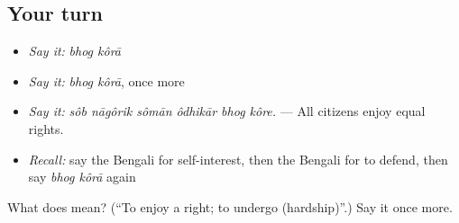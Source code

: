 \subsection*{Your turn}
\begin{itemize}
\raggedright
  \item \emph{Say it:} \emph{bhog kôrā}
  \item \emph{Say it:} \emph{bhog kôrā}, once more
  \item \emph{Say it:} \emph{sôb nāgôrik sômān ôdhikār bhog kôre.} — All citizens enjoy equal rights.
  \item \emph{Recall:} say the Bengali for self-interest, then the Bengali for to defend, then say \emph{bhog kôrā} again
\end{itemize}

\begin{tcolorbox}[breakable,colback=teal!4,colframe=teal!35!black,title={Before you move on}]
What does   mean? (\textquotedblleft{}To enjoy a right; to undergo (hardship)\textquotedblright{}.) Say it once more.
\end{tcolorbox}
